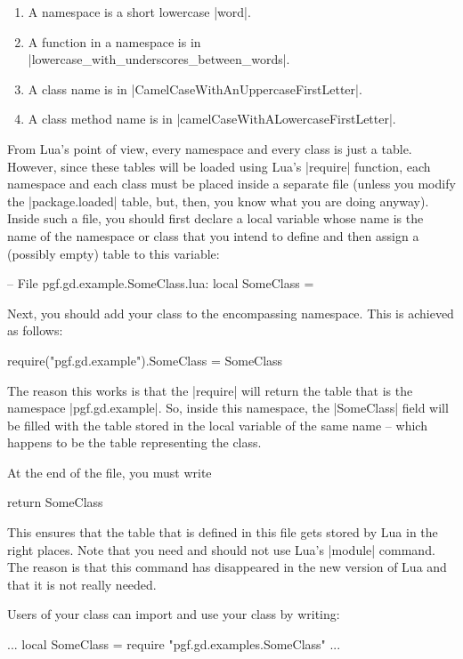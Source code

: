 \begin{enumerate}
\item A namespace is a short lowercase |word|.
\item A function in a namespace is in |lowercase_with_underscores_between_words|.
\item A class name is in |CamelCaseWithAnUppercaseFirstLetter|.
\item A class method name is in |camelCaseWithALowercaseFirstLetter|.
\end{enumerate}

From Lua's point of view, every namespace and every class is just a
table. However, since these tables will be loaded using Lua's
|require| function, each namespace and each class must be placed
inside a separate file (unless you modify the |package.loaded| table,
but, then, you know what you are doing anyway). Inside such a file, you
should first declare a local variable whose name is the name of the
namespace or class that you intend to define and then assign a
(possibly empty) table to this variable:
\begin{codeexample}
-- File pgf.gd.example.SomeClass.lua:
local SomeClass = {}
\end{codeexample}
Next, you should add your class to the encompassing namespace. This is
achieved as follows:
\begin{codeexample}
require("pgf.gd.example").SomeClass = SomeClass
\end{codeexample}
The reason this works is that the |require| will return the table that
is the namespace |pgf.gd.example|. So, inside this namespace, the
|SomeClass| field will be filled with the table stored in the local
variable of the same name -- which happens to be the table
representing the class.

At the end of the file, you must write
\begin{codeexample}
return SomeClass  
\end{codeexample}
This ensures that the table that is defined in this file gets stored
by Lua in the right places. Note that you need and should not use
Lua's |module| command. The reason is that this command has
disappeared in the new version of Lua and that it is not really
needed. 

Users of your class can import and use your class by writing:
\begin{codeexample}
...
local SomeClass = require "pgf.gd.examples.SomeClass"
...  
\end{codeexample}





